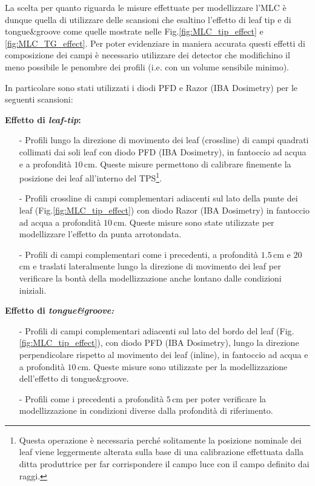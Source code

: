 La scelta per quanto riguarda le misure effettuate per modellizzare l'MLC è dunque quella di utilizzare delle scansioni che esaltino l'effetto di leaf tip e di tongue\&{}groove come quelle mostrate nelle Fig.\ref{fig:MLC_tip_effect} e \ref{fig:MLC_TG_effect}. Per poter evidenziare in maniera accurata questi effetti di composizione dei campi è necessario utilizzare dei detector che modifichino il meno possibile le penombre dei profili (i.e. con un volume sensibile minimo).

In particolare sono stati utilizzati i diodi PFD e Razor (IBA Dosimetry) per le seguenti scansioni:\vspace*{.2cm}

\textbf{Effetto di \textit{leaf-tip}:}
\begin{itemize}
\item[-] Profili lungo la direzione di movimento dei leaf (crossline) di campi quadrati collimati dai soli leaf con diodo PFD (IBA Dosimetry), in fantoccio ad acqua e a profondità $10\,$cm. Queste misure permettono di calibrare finemente la posizione dei leaf all'interno del TPS\footnote{Questa operazione è necessaria perché solitamente la posizione nominale dei leaf viene leggermente alterata sulla base di una calibrazione effettuata dalla ditta produttrice per far corrispondere il campo luce con il campo definito dai raggi.}.
\item[-] Profili crossline di campi complementari adiacenti sul lato della punte dei leaf (Fig.\ref{fig:MLC_tip_effect}) con diodo Razor (IBA Dosimetry) in fantoccio ad acqua a profondità $10\,$cm. Queste misure sono state utilizzate per modellizzare l'effetto da punta arrotondata.
\item[-] Profili di campi complementari come i precedenti, a profondità $1.5\,$cm e $20\,$cm e traslati lateralmente lungo la direzione di movimento dei leaf per verificare la bontà della modellizzazione anche lontano dalle condizioni iniziali.
\end{itemize}

\textbf{Effetto di \textit{tongue\&{}groove:}}
\begin{itemize}
\item[-] Profili di campi complementari adiacenti sul lato del bordo del leaf (Fig.\ref{fig:MLC_tip_effect}), con diodo PFD (IBA Dosimetry), lungo la direzione perpendicolare rispetto al movimento dei leaf (inline), in fantoccio ad acqua e a profondità $10\,$cm. Queste misure sono utilizzate per la modellizzazione dell'effetto di tongue\&{}groove.
\item[-] Profili come i precedenti a profondità $5\,$cm per poter verificare la modellizzazione in condizioni diverse dalla profondità di riferimento.
\end{itemize}




